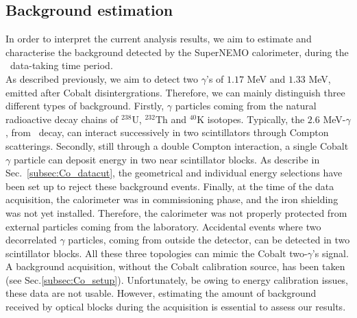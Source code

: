 \subsection{Background estimation}
\label{subsec:bkg_estimation}

In order to interpret the current analysis results, we aim to estimate and characterise the background detected by the SuperNEMO calorimeter, during the \Co\ data-taking time period.\\

As described previously, we aim to detect two $\gamma$'s of $1.17$ MeV and $1.33$ MeV, emitted after Cobalt disintergrations.
Therefore, we can mainly distinguish three different types of background.
Firstly, $\gamma$ particles coming from the natural radioactive decay chains of $^{238}$U, $^{232}$Th and $^{40}$K isotopes.
Typically, the $2.6$ MeV-$\gamma$, from \Tl\ decay, can interact successively in two scintillators through Compton scatterings.
Secondly, still through a double Compton interaction, a single Cobalt $\gamma$ particle can deposit energy in two near scintillator blocks.
As describe in Sec.~\ref{subsec:Co_datacut}, the geometrical and individual energy selections have been set up to reject these background events.
Finally, at the time of the data acquisition, the calorimeter was in commissioning phase, and the iron shielding was not yet installed.
Therefore, the calorimeter was not properly protected from external particles coming from the laboratory.
Accidental events where two decorrelated $\gamma$ particles, coming from outside the detector, can be detected in two scintillator blocks.
All these three topologies can mimic the Cobalt two-$\gamma$'s signal.
A background acquisition, without the Cobalt calibration source, has been taken (see Sec.\ref{subsec:Co_setup}).
Unfortunately, be owing to energy calibration issues, these data are not usable.
However, estimating the amount of background received by optical blocks during the acquisition is essential to assess our results.


